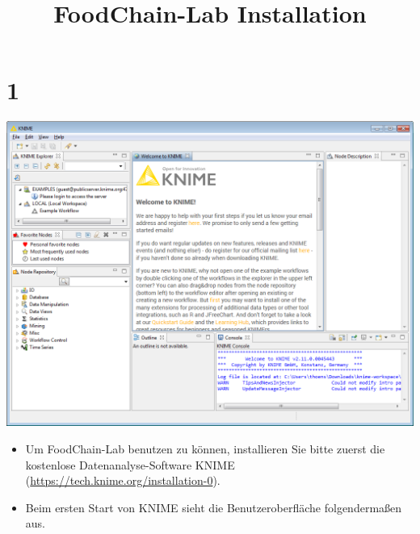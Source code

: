\documentclass{beamer}
\title{FoodChain-Lab Installation}
\date{}
\begin{document}
\maketitle
 
\section{1}
\begin{frame}
	\begin{center}
  		\includegraphics[height=0.6\textheight]{1.png}
	\end{center}
	\begin{itemize}
		\item Um FoodChain-Lab benutzen zu können, installieren Sie bitte zuerst die kostenlose Datenanalyse-Software KNIME (\url{https://tech.knime.org/installation-0}).
		\item Beim ersten Start von KNIME sieht die Benutzeroberfläche folgendermaßen aus.
	\end{itemize}
\end{frame}
\end{document}
